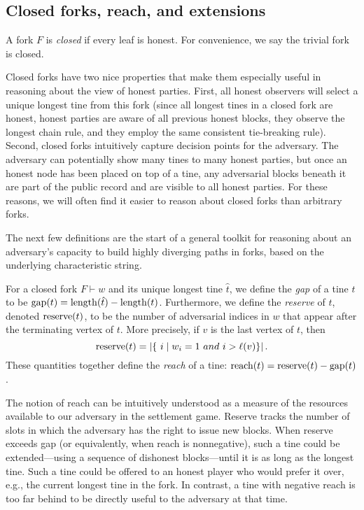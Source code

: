 
\subsection{Closed forks, reach, and extensions}
\begin{definition}
  A fork $F$ is \emph{closed} if every leaf is honest. For convenience, we say the trivial fork is closed.
\end{definition}
Closed forks have two nice properties that make them especially useful in reasoning about the view of honest parties.
First, 
all honest observers will select a unique longest tine from this fork 
(since all longest tines in a closed fork are honest, 
honest parties are aware of all previous honest blocks, 
they observe the longest chain rule, and they employ the same consistent tie-breaking rule).  
Second, 
closed forks intuitively capture decision points for the adversary.
The adversary can potentially show many tines to many honest parties, 
but once an honest node has been placed on top of 
a tine, any adversarial blocks beneath it are part of the public record and are visible to all honest parties. 
For these
reasons, we will often find it easier to reason about closed forks than arbitrary forks. %

The next few definitions are the start of a general toolkit for reasoning about an adversary's capacity to build highly diverging paths in forks, based on the underlying characteristic string.

\begin{definition}\label{def:gap-reserve-reach}
For a closed fork $F \vdash w$ and its unique longest tine $\hat{t}$, we define the \emph{gap} of a tine $t$ to be $\operatorname{gap}(t)=\operatorname{length}(\hat{t})-\operatorname{length}(t)$.
Furthermore, we define the \emph{reserve} of $t$, denoted $\operatorname{reserve}(t)$, to be the number of adversarial indices in $w$ that appear after the terminating vertex of $t$. More precisely, if $v$ is the last vertex of $t$, then
\[
  \reserve(t)=|\{\ i \mid w_i=1 \ and \ i > \ell(v)\}|\,.
  \]
These quantities together define the \emph{reach} of a tine: $
\operatorname{reach}(t)=\operatorname{reserve}(t)-\operatorname{gap}(t)$.
\end{definition}

The notion of reach can be intuitively understood as a measure of
the resources available to our adversary in the settlement
game. Reserve tracks the number of slots in which the adversary has
the right to issue new blocks.  When reserve exceeds gap (or
equivalently, when reach is nonnegative), such a tine could be
extended---using a sequence of dishonest blocks---until it is as long
as the longest tine. Such a tine could be offered to an honest player
who would prefer it over, e.g., the current longest tine in the
fork. In contrast, a tine with negative reach is too far behind to be
directly useful to the adversary at that time.

